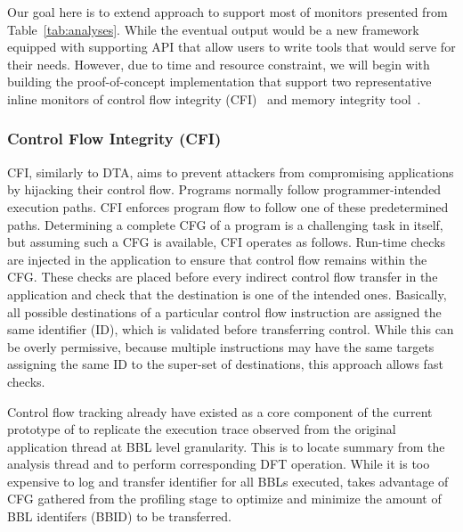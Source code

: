 Our goal here is to extend \sreplica approach to support most of monitors
presented from Table~\ref{tab:analyses}. While the eventual output would be a
new framework equipped with supporting API that allow users to write tools that
would serve for their needs. However, due to time and resource constraint, we
will begin with building the proof-of-concept implementation that support two
representative inline monitors of control flow integrity (CFI)~\cite{cfi} and
memory integrity tool~\cite{memcheck, drmemory:cgo2011}.

\subsubsection{Control Flow Integrity (CFI)} 

CFI, similarly to DTA, aims to prevent attackers from compromising applications
by hijacking their control flow. Programs normally follow programmer-intended
execution paths. CFI enforces program flow to follow one of these predetermined
paths. Determining a complete CFG of a program is a challenging task in itself,
but assuming such a CFG is available, CFI operates as follows.  Run-time checks
are injected in the application to ensure that control flow remains within the
CFG. These checks are placed before every indirect control flow transfer in the
application and check that the destination is one of the intended ones.
Basically, all possible destinations of a particular control flow instruction
are assigned the same identifier (ID), which is validated before transferring
control. While this can be overly permissive, because multiple instructions may
have the same targets assigning the same ID to the super-set of destinations,
this approach allows fast checks. 

Control flow tracking already have existed as a core component of the current
prototype of \sreplica to replicate the execution trace observed from
the original application thread at BBL level granularity. This is to locate
\tfa summary from the analysis thread and to perform corresponding DFT
operation.
%
While it is too expensive to log and transfer identifier for all BBLs executed,
\sreplica takes advantage of CFG gathered from the profiling stage to optimize
and minimize the amount of BBL identifers (BBID) to be transferred.


